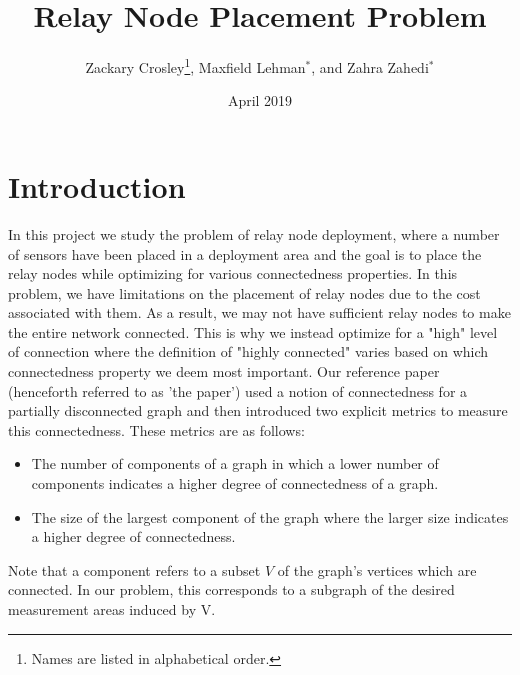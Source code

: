 \documentclass{article}
\title{Relay Node Placement Problem}
\author{Zackary Crosley\thanks{Names are listed in alphabetical order.}, Maxfield Lehman$^*$, and Zahra Zahedi$^*$}
\date{April 2019}
\begin{document}
\maketitle
\section{Introduction}
In this project we study the problem of relay node deployment, where a number of sensors have been placed in a deployment area and the goal is to place the relay nodes while optimizing for various connectedness properties.
In this problem, we have limitations on the placement of relay nodes due to the cost associated with them.
As a result, we may not have sufficient relay nodes to make the entire network connected.
This is why we instead optimize for a "high" level of connection where the definition of "highly connected" varies based on which connectedness property we deem most important.
Our reference paper \cite{relay-node} (henceforth referred to as 'the paper') used a notion of connectedness for a partially disconnected graph and then introduced two explicit metrics to measure this connectedness.
These metrics are as follows:
\begin{itemize}
    \item The number of components of a graph in which a lower number of components indicates a higher degree of connectedness of a graph.
    \item The size of the largest component of the graph where the larger size indicates a higher degree of connectedness.
\end{itemize}
Note that a component refers to a subset $V$ of the graph's vertices which are connected.
In our problem, this corresponds to a subgraph of the desired measurement areas induced by V.
\end{document}
